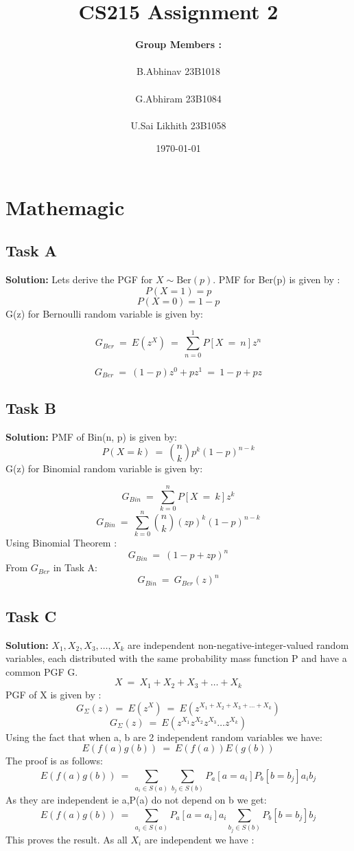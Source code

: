 \documentclass[12pt]{article}
\title{\Huge\textbf{CS215 Assignment 2}}
\author{\Large\textbf{ Group Members :} \\ \\ 
    \large B.Abhinav  23B1018 \\ \\ 
    \large G.Abhiram  23B1084 \\ \\
    \large U.Sai Likhith 23B1058 
}
\date{\today}
\begin{document}
\maketitle
\newpage

\tableofcontents
\newpage

\section{Mathemagic}
\subsection{Task A}
\textbf{Solution: } \newline
Lets derive the PGF for $X \sim \text{Ber}(p)$. PMF for Ber(p) is given by :
\[P(X=1) = p\]
\[P(X=0) = 1-p\]
G(z) for Bernoulli random variable is given by:

\[G_{Ber}\ =\ E(z^X)\ =\ \sum_{n=0}^{1}P[X\ =\ n]z^n \]

\begin{equation}
    G_{Ber}\ =\ (1-p)z^0+pz^1\ =\ 1-p+pz
\end{equation}

\subsection{Task B}
\textbf{Solution: } \newline
PMF of Bin(n, p) is given by: 
\[P(X=k)\ =\ \binom{n}{k}p^k(1-p)^{n-k}\]
G(z) for Binomial random variable is given by:

\[G_{Bin}\ =\ \sum_{k=0}^nP[X\ =\ k]z^k\]
\[G_{Bin}\ =\ \sum_{k=0}^n\binom{n}{k}(zp)^k(1-p)^{n-k}\]
Using Binomial Theorem :
\begin{equation}
    G_{Bin}\ =\ (1-p+zp)^{n}
\end{equation}
From $G_{Ber}$ in Task A:
\begin{equation}
    G_{Bin}\ =\ G_{Ber}(z)^n
\end{equation}

\subsection{Task C}
\textbf{Solution: } \newline
$X_1,X_2,X_3,\dots,X_k$ are independent non-negative-integer-valued random variables, each distributed with the same probability mass function P and have a common PGF G.
\[X\ =\ X_1+X_2+X_3+\dots+X_k\]
PGF of X is given by :
\[G_{\Sigma}(z)\ =\ E(z^X)\ =\ E(z^{X_1+X_2+X_3+\dots+X_k})\]
\[G_{\Sigma}(z)\ =\ E(z^{X_1}z^{X_2}z^{X_3}\dots z^{X_k})\]
Using the fact that when a, b are 2 independent random variables we have:
\begin{equation}
    E(f(a)g(b))\ =\ E(f(a))E(g(b))
\end{equation}
The proof is as follows:
\[E(f(a)g(b))\ =\ \sum_{a_i\in S(a)}^{}\sum_{b_j\in S(b)}^{}P_a[a=a_i]P_b[b=b_j]a_ib_j\]
As they are independent ie a,P(a) do not depend on b we get:
\[E(f(a)g(b))\ =\ \sum_{a_i\in S(a)}^{}P_a[a=a_i]a_i\sum_{b_j\in S(b)}^{}P_b[b=b_j]b_j\]
This proves the result.
As all $X_i$ are independent we have :
\end{document}
